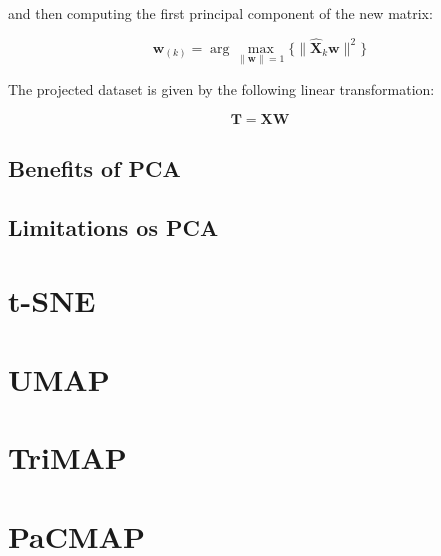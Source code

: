 and then computing the first principal component of the new matrix:

\begin{equation}
	\mathbf{w}_{(k)}=\arg\max_{\lVert \mathbf{w} \rVert = 1}{\Bigg\{ \lVert \mathbf{\hat {X}}_{k}\mathbf{w} \rVert ^2 \Bigg\} }
	\label{eq:pca:wk}
\end{equation}

The projected dataset is given by the following linear transformation:

\begin{equation}
	\mathbf{T} = \mathbf{XW}
	\label{eq:pca:t}
\end{equation}

\subsection{Benefits of PCA}\label{subsec:benefits-of-pca}



\subsection{Limitations os PCA}\label{subsec:limitations-os-pca}


\section{t-SNE}\label{sec:t-sne}


\section{UMAP}\label{sec:umap}


\section{TriMAP}\label{sec:trimap}


\section{PaCMAP}\label{sec:pacmap}


